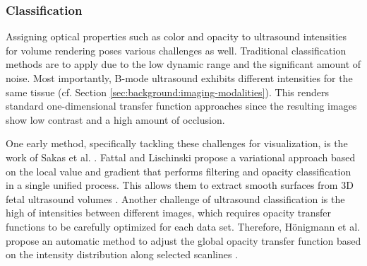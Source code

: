 \subsubsection{Classification}
Assigning optical properties such as color and opacity to ultrasound intensities for volume rendering poses various challenges as well.
Traditional classification methods are  to apply due to the low dynamic range and the significant amount of noise.
Most importantly, B-mode ultrasound exhibits different intensities for the same tissue (cf. Section \ref{sec:background:imaging-modalities}).
This renders standard one-dimensional transfer function approaches  since the resulting images show low contrast and a high amount of occlusion.

One early method, specifically tackling these challenges for visualization, is the work of Sakas et al. \cite{Sakas:1995:UsVis}.
Fattal and Lischinski propose a variational approach based on the local value and gradient that performs filtering and opacity classification in a single unified process.
This allows them to extract smooth surfaces from 3D fetal ultrasound volumes \cite{Fattal:2001:VariationalClassification}.
Another challenge of ultrasound classification is the high  of intensities between different images, which requires opacity transfer functions to be carefully optimized for each data set.
Therefore, Hönigmann et al. propose an automatic method to adjust the global opacity transfer function based on the intensity distribution along selected scanlines \cite{Honigmann:2003:AdaptiveOTF}.

